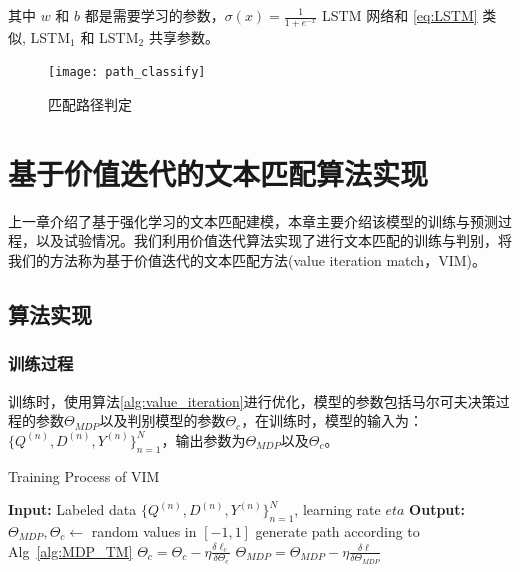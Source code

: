 其中 $w$ 和 $b$ 都是需要学习的参数，$\sigma(x) = \frac{1}{1+e^{-x}}$
LSTM 网络和 \ref{eq:LSTM} 类似, LSTM$_1$  和 LSTM$_2$ 共享参数。
\begin{figure}[!htbp]
    \centering
    \vspace{1em}
    \texttt{[image: path\_classify]}
    \caption{匹配路径判定}
    \label{fig:path_classify}
    \vspace{1em}
\end{figure}


\chapter{基于价值迭代的文本匹配算法实现}
上一章介绍了基于强化学习的文本匹配建模，本章主要介绍该模型的训练与预测过程，以及试验情况。我们利用价值迭代算法实现了进行文本匹配的训练与判别，将我们的方法称为基于价值迭代的文本匹配方法(value iteration match，VIM)。
\section{算法实现}

\subsection{训练过程}

训练时，使用算法\ref{alg:value_iteration}进行优化，模型的参数包括马尔可夫决策过程的参数$\Theta_{MDP}$以及判别模型的参数$\Theta_c$，在训练时，模型的输入为：$\{Q^{(n)}, D^{(n)}, Y^{(n)}\}_{n=1}^N$，输出参数为$\Theta_{MDP}$以及$\Theta_c$。

\begin{algorithm}[!htbp]
	\small
	\caption{Training Process of VIM}
	\label{alg:VIM_train}
	\begin{algorithmic}
		\STATE \textbf{Input:} Labeled data $\{Q^{(n)}, D^{(n)}, Y^{(n)}\}_{n=1}^N$, learning rate $eta$
		\STATE \textbf{Output:} $\Theta_{MDP}, \Theta_{c} \leftarrow$ random values in $[-1, 1]$
			\STATE generate path according to Alg~\ref{alg:MDP_TM}
				\STATE $\Theta_{c} = \Theta_{c} - \eta \frac{\delta \ell_c}{\delta \Theta_{c}}$ 
			\ENDWHILE
			\STATE $\Theta_{MDP} = \Theta_{MDP} - \eta \frac{\delta \ell}{\delta \Theta_{MDP}}$ 
			\ENDWHILE
	\end{algorithmic}
\end{algorithm}

